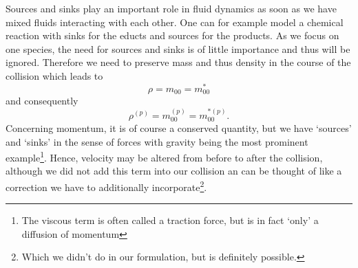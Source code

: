 Sources and sinks play an important role in fluid dynamics as soon as we have mixed fluids interacting with each other.
One can for example model a chemical reaction with sinks for the educts and sources for the products.
As we focus on one species, the need for sources and sinks is of little importance and thus will be ignored.
Therefore we need to preserve mass and thus density in the course of the collision which leads to
\begin{equation}
    \rho  = m_{00} = m_{00}^*
\end{equation}
and consequently
\begin{equation}
    \rho^{(p)} = m_{00}^{(p)} = m_{00}^{*(p)}.
\end{equation}
Concerning momentum, it is of course a conserved quantity, but we have `sources' and `sinks' in the sense of forces with gravity being the most prominent example\footnote{The viscous term is often called a traction force, but is in fact `only' a diffusion of momentum}.
Hence, velocity may be altered from before to after the collision, although we did not add this term into our collision an can be thought of like a correction we have to additionally incorporate\footnote{Which we didn't do in our formulation, but is definitely possible.}.
